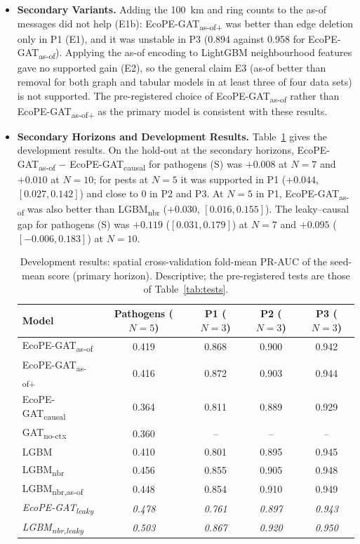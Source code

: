 \documentclass[a4paper,fleqn]{cas-sc}
\newcommand{\Masof}{\mbox{EcoPE-GAT\textsubscript{as-of}}}
\newcommand{\Masofplus}{\mbox{EcoPE-GAT\textsubscript{as-of+}}}
\newcommand{\Mcausal}{\mbox{EcoPE-GAT\textsubscript{causal}}}
\newcommand{\Mleaky}{\mbox{EcoPE-GAT\textsubscript{leaky}}}
\newcommand{\Mnoctx}{\mbox{GAT\textsubscript{no-ctx}}}
\newcommand{\Lg}{\mbox{LGBM}}
\newcommand{\Lnbr}{\mbox{LGBM\textsubscript{nbr}}}
\newcommand{\Lleaky}{\mbox{LGBM\textsubscript{nbr,leaky}}}
\newcommand{\Lasof}{\mbox{LGBM\textsubscript{nbr,as-of}}}
\begin{document}
\begin{itemize}[leftmargin=1.4em]
\item \textbf{Secondary Variants.}
Adding the 100~km and ring counts to the as-of messages did not help (E1b): \Masofplus{} was better than edge deletion only in P1 (E1), and it was unstable in P3 (0.894 against 0.958 for \Masof). Applying the as-of encoding to LightGBM neighbourhood features gave no supported gain (E2), so the general claim E3 (as-of better than removal for both graph and tabular models in at least three of four data sets) is not supported. The pre-registered choice of \Masof{} rather than \Masofplus{} as the primary model is consistent with these results.

\item \textbf{Secondary Horizons and Development Results.}
Table~\ref{tab:dev} gives the development results. On the hold-out at the secondary horizons, \Masof{} $-$ \Mcausal{} for pathogens (S) was $+0.008$ at $N=7$ and $+0.010$ at $N=10$; for pests at $N=5$ it was supported in P1 ($+0.044$, $[0.027, 0.142]$) and close to 0 in P2 and P3. At $N=5$ in P1, \Masof{} was also better than \Lnbr{} ($+0.030$, $[0.016, 0.155]$). The leaky--causal gap for pathogens (S) was $+0.119$ ($[0.031, 0.179]$) at $N=7$ and $+0.095$ ($[-0.006, 0.183]$) at $N=10$.

\begin{table}[t]
\centering
\caption{Development results: spatial cross-validation fold-mean PR-AUC of the seed-mean score (primary horizon). Descriptive; the pre-registered tests are those of Table~\ref{tab:tests}.}
\label{tab:dev}
\small
\begin{tabular}{lcccc}
\toprule
Model & Pathogens ($N=5$) & P1 ($N=3$) & P2 ($N=3$) & P3 ($N=3$) \\
\midrule
\Masof        & 0.419 & 0.868 & 0.900 & 0.942 \\
\Masofplus    & 0.416 & 0.872 & 0.903 & 0.944 \\
\Mcausal      & 0.364 & 0.811 & 0.889 & 0.929 \\
\Mnoctx       & 0.360 & -- & -- & -- \\
\Lg           & 0.410 & 0.801 & 0.895 & 0.945 \\
\Lnbr         & 0.456 & 0.855 & 0.905 & 0.948 \\
\Lasof        & 0.448 & 0.854 & 0.910 & 0.949 \\
\textit{\Mleaky} & \textit{0.478} & \textit{0.761} & \textit{0.897} & \textit{0.943} \\
\textit{\Lleaky} & \textit{0.503} & \textit{0.867} & \textit{0.920} & \textit{0.950} \\
\bottomrule
\end{tabular}
\end{table}


\end{itemize}
\end{document}
